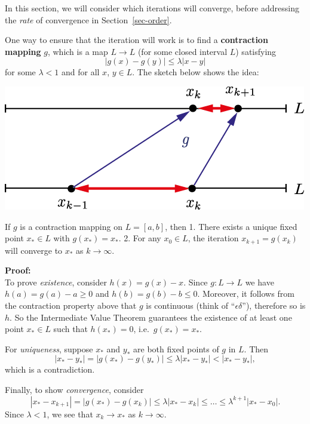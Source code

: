 \documentclass[
  letterpaper,
  DIV=11,
  numbers=noendperiod]{scrreprt}
\newenvironment{fbxSimple}[3]{\begin{tcolorbox}[enhanced, breakable,%
attach boxed title to top*={xshift=1.4pt},
boxed title style={boxrule=0.0mm, fuzzy shadow={1pt}{-1pt}{0mm}{0.1mm}{gray}, arc=.3em, rounded corners=east, sharp corners=west}, colframe=#1-color2, colbacktitle=#1-color1, colback = white, coltitle=black,  titlerule=0mm, toprule=0pt, bottomrule=.7pt, leftrule=.3em, rightrule=.7pt, outer arc=.3em,  	left=.5em, right=.5em, bottomtitle=1mm, toptitle=1mm,title=\textbf{#2}\hspace{0.5em}{#3}]}
{\end{tcolorbox}}
\begin{document}
In this section, we will consider which iterations will converge, before
addressing the \emph{rate} of convergence in Section~\ref{sec-order}.

One way to ensure that the iteration will work is to find a
\textbf{contraction mapping} \(g\), which is a map \(L\to L\) (for some
closed interval \(L\)) satisfying \[
|g(x)-g(y)| \leq \lambda|x-y|
\] for some \(\lambda < 1\) and for all \(x\), \(y \in L\). The sketch
below shows the idea:

\begin{center}
\includegraphics[width=0.7\linewidth,height=\textheight,keepaspectratio]{im/contraction.png}
\end{center}

\label{contraction-mapping-theorem}
\begin{fbxSimple}{theorem}{Theorem 2.9: }{Contraction Mapping Theorem}
\label{contraction-mapping-theorem}
If \(g\) is a contraction mapping on \(L=[a,b]\), then 1. There exists a
unique fixed point \(x_*\in L\) with \(g(x_*)=x_*\). 2. For any
\(x_0\in L\), the iteration \(x_{k+1}=g(x_k)\) will converge to \(x_*\)
as \(k\to\infty\).

\end{fbxSimple}

\textbf{Proof:}\\
To prove \emph{existence}, consider \(h(x)=g(x)-x\). Since \(g:L\to L\)
we have \(h(a)=g(a)-a\geq 0\) and \(h(b)=g(b)-b\leq 0\). Moreover, it
follows from the contraction property above that \(g\) is continuous
(think of ``\(\epsilon\delta\)''), therefore so is \(h\). So the
Intermediate Value Theorem guarantees the existence of at least one
point \(x_*\in L\) such that \(h(x_*)=0\), i.e.~\(g(x_*)=x_*\).

For \emph{uniqueness}, suppose \(x_*\) and \(y_*\) are both fixed points
of \(g\) in \(L\). Then \[
|x_*-y_*| = |g(x_*)-g(y_*)| \leq \lambda |x_*-y_*| < |x_*-y_*|,
\] which is a contradiction.

Finally, to show \emph{convergence}, consider \[
|x_*- x_{k+1} | = |g(x_*) - g(x_k)| \leq \lambda |x_* - x_k| \leq \ldots \leq \lambda^{k+1}|x_*-x_0|.
\] Since \(\lambda<1\), we see that \(x_k\to x_*\) as \(k\to\infty\).
\end{document}
